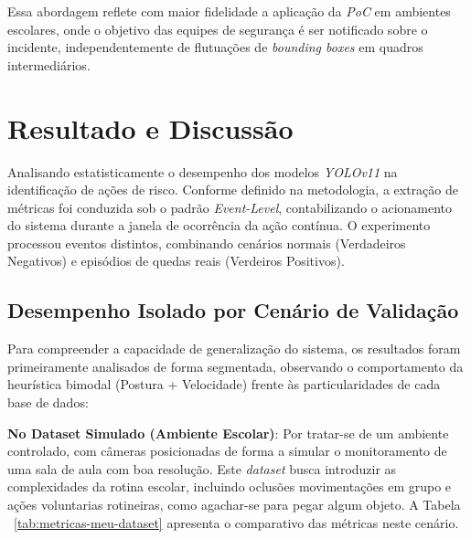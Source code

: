 \documentclass[12pt]{article}
\begin{document}
Essa abordagem reflete com maior fidelidade a aplicação da \textit{PoC} em ambientes escolares, onde o
objetivo das equipes de segurança é ser notificado sobre o incidente, independentemente de flutuações
de \textit{bounding boxes} em quadros intermediários.

\section{Resultado e Discussão}

Analisando estatisticamente o desempenho dos modelos \textit{YOLOv11} na identificação de ações de risco. 
Conforme definido na metodologia, a extração de métricas foi conduzida sob o padrão \textit{Event-Level}, 
contabilizando o acionamento do sistema durante a janela de ocorrência da ação contínua. O experimento 
processou eventos distintos, combinando cenários normais (Verdadeiros Negativos) e episódios de quedas reais
(Verdeiros Positivos).

\subsection{Desempenho Isolado por Cenário de Validação}

Para compreender a capacidade de generalização do sistema, os resultados foram primeiramente analisados
de forma segmentada, observando o comportamento da heurística bimodal (Postura + Velocidade) frente às
particularidades de cada base de dados:


\textbf{No Dataset Simulado (Ambiente Escolar)}: Por tratar-se de um ambiente controlado, com câmeras
posicionadas de forma a simular o monitoramento de uma sala de aula com boa resolução. Este \textit{dataset}
busca introduzir as complexidades da rotina escolar, incluindo oclusões movimentações em grupo e ações
voluntarias rotineiras, como agachar-se para pegar algum objeto. A Tabela ~\ref{tab:metricas-meu-dataset}
apresenta o comparativo das métricas neste cenário.
\end{document}

